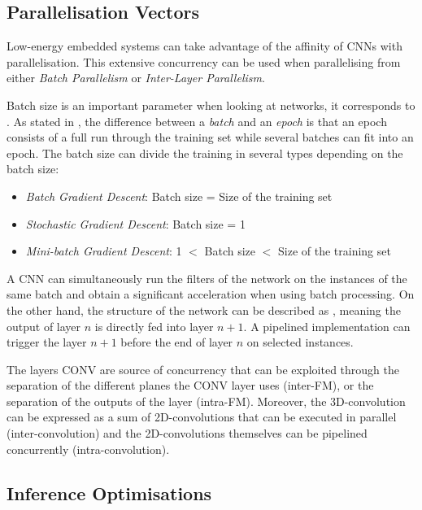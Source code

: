 \subsection{Parallelisation Vectors}

Low-energy embedded systems can take advantage of the affinity of CNNs with parallelisation. This extensive concurrency can be used when parallelising from either \emph{Batch Parallelism} or \emph{Inter-Layer Parallelism}.

Batch size is an important parameter when looking at networks, it corresponds to  \cite{MLMastery2019}. As stated in \cite{MLMastery2019}, the difference between a \emph{batch} and an \emph{epoch} is that an epoch consists of a full run through the training set while several batches can fit into an epoch. The batch size can divide the training in several types depending on the batch size:

\begin{itemize}
	\item \emph{Batch Gradient Descent}: Batch size = Size of the training set
	\item \emph{Stochastic Gradient Descent}: Batch size = 1
	\item \emph{Mini-batch Gradient Descent}: 1 $<$ Batch size $<$ Size of the training set
\end{itemize}

A CNN can simultaneously run the filters of the network on the instances of the same batch and obtain a significant acceleration when using batch processing. On the other hand, the structure of the network can be described as , meaning the output of layer $n$ is directly fed into layer $n+1$. A pipelined implementation can trigger the layer $n+1$ before the end of layer $n$ on selected instances.

The layers CONV are source of concurrency that can be exploited through the separation of the different planes the CONV layer uses (inter-FM), or the separation of the outputs of the layer (intra-FM). Moreover, the 3D-convolution can be expressed as a sum of 2D-convolutions that can be executed in parallel (inter-convolution) and the 2D-convolutions themselves can be pipelined concurrently (intra-convolution).

\subsection{Inference Optimisations}

